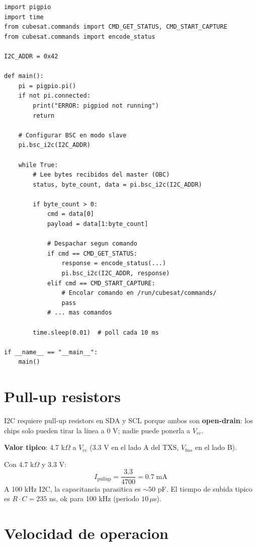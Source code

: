 \documentclass[11pt,a4paper,oneside,openright]{book}
\begin{document}
\begin{lstlisting}
import pigpio
import time
from cubesat.commands import CMD_GET_STATUS, CMD_START_CAPTURE
from cubesat.commands import encode_status

I2C_ADDR = 0x42

def main():
    pi = pigpio.pi()
    if not pi.connected:
        print("ERROR: pigpiod not running")
        return

    # Configurar BSC en modo slave
    pi.bsc_i2c(I2C_ADDR)

    while True:
        # Lee bytes recibidos del master (OBC)
        status, byte_count, data = pi.bsc_i2c(I2C_ADDR)

        if byte_count > 0:
            cmd = data[0]
            payload = data[1:byte_count]

            # Despachar segun comando
            if cmd == CMD_GET_STATUS:
                response = encode_status(...)
                pi.bsc_i2c(I2C_ADDR, response)
            elif cmd == CMD_START_CAPTURE:
                # Encolar comando en /run/cubesat/commands/
                pass
            # ... mas comandos

        time.sleep(0.01)  # poll cada 10 ms

if __name__ == "__main__":
    main()
\end{lstlisting}

\section{Pull-up resistors}

I2C requiere pull-up resistors en SDA y SCL porque ambos son
\textbf{open-drain}: los chips solo pueden tirar la linea a 0 V; nadie
puede ponerla a $V_{cc}$.

\textbf{Valor tipico}: 4.7 k$\Omega$ a $V_{cc}$ (3.3 V en el lado A del
TXS, $V_{bus}$ en el lado B).

\begin{calculo}
Con 4.7 k$\Omega$ y 3.3 V:
\[
I_{\text{pullup}} = \frac{3.3}{4700} = 0.7\;\text{mA}
\]
A 100 kHz I2C, la capacitancia parasitica es $\sim 50$ pF. El tiempo de
subida tipico es $R \cdot C = 235$ ns, ok para 100 kHz (periodo $10\,\mu$s).
\end{calculo}

\section{Velocidad de operacion}
\end{document}
